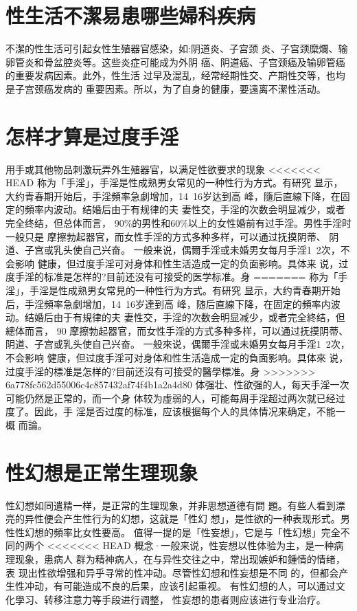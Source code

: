 \documentclass[12pt,UTF8]{ctexbook}
\begin{document}
\section{性生活不潔易患哪些婦科疾病}

不潔的性生活可引起女性生殖器官感染，如:阴道炎、子宫颈
炎、子宫颈糜爛、输卵管炎和骨盆腔炎等。这些炎症可能成为外阴
癌、阴道癌、子宫颈癌及输卵管癌的重要发病因素。此外，性生活
过早及混乱，经常经期性交、产期性交等，也均是子宫颈癌发病的
重要因素。所以，为了自身的健康，要遠离不潔性活动。

\section{怎样才算是过度手淫}

用手或其他物品刺激玩弄外生殖器官，以满足性欲要求的现象
<<<<<<< HEAD
称为「手淫」，手淫是性成熟男女常见的一种性行为方式。有研究
显示，大约青春期开始后，手淫頻率急劇增加，14~16岁达到高
峰，隨后直線下降，在固定的頻率内波动。结婚后由于有规律的夫
妻性交，手淫的次数会明显减少，或者完全终结，但总体而言，
90\%的男性和60\%以上的女性婚前有过手淫。男性手淫时一般只是
摩擦勃起器官，而女性手淫的方式多种多样，可以通过抚摸阴蒂、
阴道、子宫或乳头使自己兴奋。
一般来说，偶爾手淫或未婚男女每月手淫1~2次，不会影响
健康，但过度手淫可对身体和性生活造成一定的负面影响。具体来
说，过度手淫的标准是怎样的?目前还没有可接受的医学标准。身
=======
称为「手淫」，手淫是性成熟男女常見的一种性行为方式。有研究
显示，大约青春期开始后，手淫頻率急劇增加，14~16岁達到高
峰，随后直線下降，在固定的頻率内波动。结婚后由于有規律的夫
妻性交，手淫的次数会明显减少，或者完全終结，但總体而言，
90%
摩擦勃起器官，而女性手淫的方式多种多样，可以通过抚摸阴蒂、
阴道、子宫或乳头使自己兴奋。
一般來说，偶爾手淫或未婚男女每月手淫1~2次，不会影响
健康，但过度手淫可对身体和性生活造成一定的負面影响。具体來
说，过度手淫的標准是怎样的?目前还沒有可接受的醫學標准。身
>>>>>>> 6a778fc562d55006c4c857432af74f4b1a2a4d80
体强壮、性欲强的人，每天手淫一次可能仍然是正常的，而一个身
体较为虛弱的人，可能每周手淫超过两次就已经过度了。因此，手
淫是否过度的标准，应该根据每个人的具体情况来确定，不能一概
而論。
\section{性幻想是正常生理现象}
性幻想如同遣精一样，是正常的生理现象，并非思想道德有問
題。有些人看到漂亮的异性便会产生性行为的幻想，这就是「性幻
想」，是性欲的一种表现形式。男性性幻想的頻率比女性要高。
值得一提的是「性妄想」，它是与「性幻想」完全不同的两个
<<<<<<< HEAD
概念·一般来说，性妄想以性体验为主，是一种病理现象，患病人
群为精神病人，在与异性交往之中，常出现嫉妒和鍾情的情绪，表
现出性欲增强和异乎寻常的性冲动。尽管性幻想和性妄想是不同
的，但都会产生性冲动，有可能造成不良的后果，应该引起重视。
有性幻想的人，可以通过文化學习、转移注意力等手段进行调整，
性妄想的患者则应该进行专业治疗。
\end{document}
